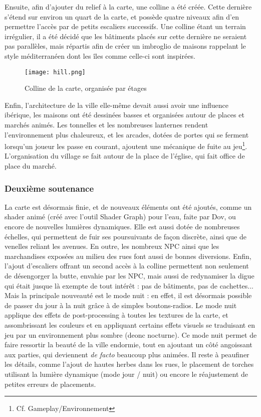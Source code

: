     Ensuite, afin d’ajouter du relief à la carte, une colline a été créée. 
    Cette dernière s’étend sur environ un quart de la carte, et possède quatre 
    niveaux afin d’en permettre l’accès par de petits escaliers successifs. 
    Une colline étant un terrain irrégulier, il a été décidé que les bâtiments 
    placés sur cette dernière ne seraient pas parallèles, mais répartis afin de 
    créer un imbroglio de maisons rappelant le style méditerranéen dont les îles 
    comme celle-ci sont inspirées.


    \begin{figure}[hbt!]
        \centering
        \texttt{[image: hill.png]}
        \caption{Colline de la carte, organisée par étages}
    \end{figure}
    \FloatBarrier


    Enfin, l’architecture de la ville elle-même devait aussi avoir une influence 
    ibérique, les maisons ont été dessinées basses et organisées autour de places et 
    marchés animés. Les tonnelles et les nombreuses lanternes rendent l’environnement 
    plus chaleureux, et les arcades, dotées de portes qui se ferment lorsqu’un joueur 
    les passe en courant, ajoutent une mécanique de fuite au jeu\footnote{Cf. Gameplay/Environnement}. L’organisation du 
    village se fait autour de la place de l’église, qui fait office de place du marché.\\


\subsubsection{Deuxième soutenance}

    La carte est désormais finie, et de nouveaux éléments ont été ajoutés, comme un shader animé (créé avec l'outil Shader Graph) pour l'eau,
    faite par Dov, ou encore de nouvelles lumières dynamiques. Elle est aussi dotée de nombreuses échelles, qui permettent de fuir ses poursuivants 
    de façon discrète, ainsi que de venelles reliant les avenues.
    En outre, les nombreux NPC ainsi que les marchandises exposées au milieu des rues font aussi de bonnes diversions.
    Enfin, l'ajout d'escaliers offrant un second accès à la colline permettent non seulement de désengorger la butte, envahie par les NPC, mais aussi 
    de redynamiser la digue qui était jusque là exempte de tout intérêt : pas de bâtiments, pas de cachettes...
    \\
    Mais la principale nouveauté est le mode nuit : en effet, il est désormais possible de passer du jour à la nuit grâce à de simples boutons-radios. 
    Le mode nuit applique des effets de post-processing à toutes les textures de la carte, et assombrissant les couleurs et en appliquant certains effets 
    visuels se traduisant en jeu par un environnement plus sombre (deonc nocturne). 
    Ce mode nuit permet de faire ressortir la beauté de la ville endormie, tout en ajoutant un côté angoissant aux parties,
    qui deviennent \textit{de facto} beaucoup plus animées.
    Il reste à peaufiner les détails, comme l'ajout de hautes herbes dans les rues, le placement de torches utilisant 
    la lumière dynamique (mode jour / nuit) ou encore le réajustement de petites erreurs de placements.

